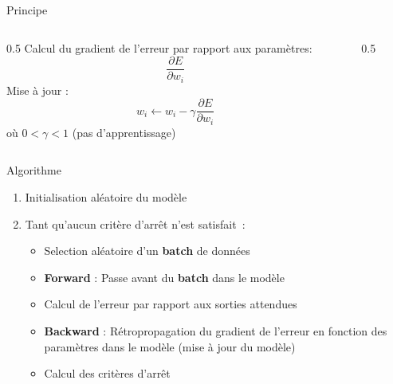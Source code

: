 
\begin{frame}{Principe}
  \begin{columns}
    \begin{column}{0.5\tw}
      Calcul du gradient de l'erreur par rapport aux paramètres:
      \[
        \frac{\partial{E}}{\partial{w_i}}
      \]
      Mise à jour :
      \[
        w_i \leftarrow w_i - \gamma\frac{\partial{E}}{\partial{w_i}}
      \]
      où $0 < \gamma < 1$ (pas d'apprentissage)
    \end{column}
    \begin{column}{0.5\tw}
    \end{column}
  \end{columns}
\end{frame}

\begin{frame}{Algorithme}
  \begin{enumerate}[<+->]
    \item Initialisation aléatoire du modèle
    \item Tant qu'aucun critère d'arrêt n'est satisfait~:
      \begin{itemize}
        \item Selection aléatoire d'un \textbf{batch} de données
        \item \textbf{Forward} : Passe avant du \textbf{batch} dans le modèle
        \item Calcul de l'erreur par rapport aux sorties attendues
        \item \textbf{Backward} : Rétropropagation du gradient de l'erreur en fonction des paramètres dans le modèle (mise à jour du modèle)
        \item Calcul des critères d'arrêt
      \end{itemize}
  \end{enumerate}
\end{frame}


